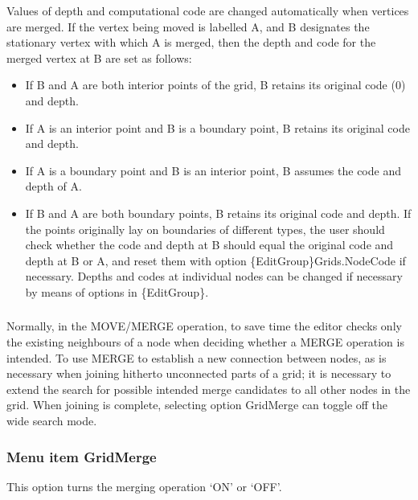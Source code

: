 \documentclass{article}
\begin{document}
Values of depth and computational code are changed automatically when vertices are merged. If the vertex being moved is labelled A, and B designates the stationary vertex with which A is merged, then the depth and code for the merged vertex at B are set as follows:

\begin{itemize}
\item If B and A are both interior points of the grid, B retains its original code (0) and depth.
\item If A is an interior point and B is a boundary point, B retains its original code and depth.
\item If A is a boundary point and B is an interior point, B assumes the code and depth of A.
\item If B and A are both boundary points, B retains its original code and depth. If the points originally lay on boundaries of different types, the user should check whether the code and depth at B should equal the original code and depth at B or A, and reset them with option \{EditGroup\}Grids.NodeCode if necessary. Depths and codes at individual nodes can be changed if necessary by means of options in \{EditGroup\}.
\end{itemize}

\bigskip

\subsubsection*{}
Normally, in the MOVE/MERGE operation, to save time the editor checks only the existing neighbours of a node when deciding whether a MERGE operation is intended. To use MERGE to establish a new connection between nodes, as is necessary when joining hitherto unconnected parts of a grid; it is necessary to extend the search for possible intended merge candidates to all other nodes in the grid. When joining is complete, selecting option GridMerge can toggle off the wide search mode.

\subsubsection*{}
\subsubsection[Menu item GridMerge]{Menu item GridMerge}
This option turns the merging operation `ON' or `OFF'.
\end{document}
